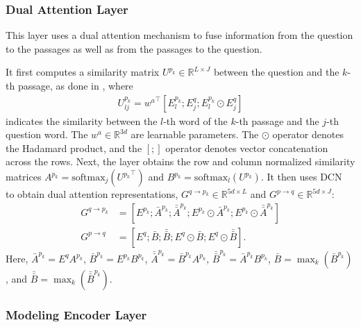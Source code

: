 \documentclass[11pt,a4paper]{article}
\theoremstyle{mydef}
\theoremstyle{myprob}
\begin{document}
\subsubsection{Dual Attention Layer}
\label{sec:dual}

This layer uses a dual attention mechanism to fuse information from the question to the passages 
as well as from the passages to the question. 

It first computes a similarity matrix $U^{p_k} \in \mathbb{R}^{L{\times}J}$ between the question and the $k$-th passage, as done in \citep{SeoKFH17}, where
\begin{align}
\nonumber
U^{p_k}_{lj} = {w^a}^\top [ E^{p_k}_l; E^q_j; E^{p_k}_l \odot E^q_j ]
\end{align}
indicates the similarity between the $l$-th word of the $k$-th passage and the $j$-th question word. The $w^a \in \mathbb{R}^{3d}$ are learnable parameters. The $\odot$ operator denotes the Hadamard product, and the $[;]$ operator denotes vector concatenation across the rows. Next, the layer obtains 
the row and column 
normalized similarity matrices $A^{p_k} = \mathrm{softmax}_j({U^{p_k}}^\top)$
and $B^{p_k}  = \mathrm{softmax}_{l}(U^{p_k})$.
It then uses DCN~\citep{XiongZS17} 
to obtain dual attention representations, $G^{q \rightarrow p_k} \in \mathbb{R}^{5d \times L}$ and $G^{p \rightarrow q} \in \mathbb{R}^{5d \times J}$:
\begin{align}
\nonumber
G^{q \rightarrow p_k} &= [E^{p_k}; \bar{A}^{p_k}; \bar{\bar{A}}^{p_k}; E^{p_k} \odot \bar{A}^{p_k}; E^{p_k} \odot \bar{\bar{A}}^{p_k}] \\
\nonumber
G^{p \rightarrow q} &= [ E^{q} ; \bar{B}; \bar{\bar{B}}; 
 E^{q} \odot \bar{B}; E^{q} \odot \bar{\bar{B}} ].
\end{align}
Here, $\bar{A}^{p_k} =  E^q A^{p_k}$, %
$\bar{B}^{p_k} =  E^{p_k} B^{p_k}$, %
$\bar{\bar{A}}^{p_k} = \bar{B}^{p_k} A^{p_k}$, %
$\bar{\bar{B}}^{p_k} = \bar{A}^{p_k} B^{p_k}$, %
$\bar{B} = \max_k(\bar{B}^{p_k})$, and
$\bar{\bar{B}} = \max_k(\bar{\bar{B}}^{p_k})$.



\subsubsection{Modeling Encoder Layer}
\end{document}
